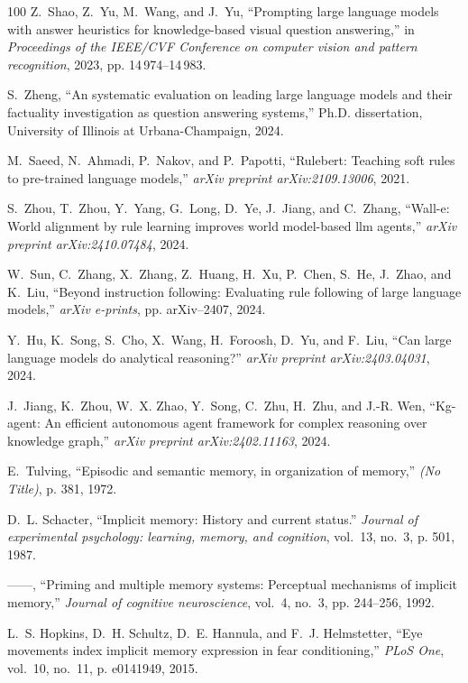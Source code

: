 \documentclass[10pt,journal,compsoc]{IEEEtran}
\begin{document}
\begin{thebibliography}{100}
	Z.~Shao, Z.~Yu, M.~Wang, and J.~Yu, ``Prompting large language models with
	answer heuristics for knowledge-based visual question answering,'' in
	\emph{Proceedings of the IEEE/CVF Conference on computer vision and pattern
		recognition}, 2023, pp. 14\,974--14\,983.
	
	S.~Zheng, ``An systematic evaluation on leading large language models and their
	factuality investigation as question answering systems,'' Ph.D. dissertation,
	University of Illinois at Urbana-Champaign, 2024.
	
	M.~Saeed, N.~Ahmadi, P.~Nakov, and P.~Papotti, ``Rulebert: Teaching soft rules
	to pre-trained language models,'' \emph{arXiv preprint arXiv:2109.13006},
	2021.
	
	S.~Zhou, T.~Zhou, Y.~Yang, G.~Long, D.~Ye, J.~Jiang, and C.~Zhang, ``Wall-e:
	World alignment by rule learning improves world model-based llm agents,''
	\emph{arXiv preprint arXiv:2410.07484}, 2024.
	
	W.~Sun, C.~Zhang, X.~Zhang, Z.~Huang, H.~Xu, P.~Chen, S.~He, J.~Zhao, and
	K.~Liu, ``Beyond instruction following: Evaluating rule following of large
	language models,'' \emph{arXiv e-prints}, pp. arXiv--2407, 2024.
	
	Y.~Hu, K.~Song, S.~Cho, X.~Wang, H.~Foroosh, D.~Yu, and F.~Liu, ``Can large
	language models do analytical reasoning?'' \emph{arXiv preprint
		arXiv:2403.04031}, 2024.
	
	J.~Jiang, K.~Zhou, W.~X. Zhao, Y.~Song, C.~Zhu, H.~Zhu, and J.-R. Wen,
	``Kg-agent: An efficient autonomous agent framework for complex reasoning
	over knowledge graph,'' \emph{arXiv preprint arXiv:2402.11163}, 2024.
	
	E.~Tulving, ``Episodic and semantic memory, in organization of memory,''
	\emph{(No Title)}, p. 381, 1972.
	
	D.~L. Schacter, ``Implicit memory: History and current status.'' \emph{Journal
		of experimental psychology: learning, memory, and cognition}, vol.~13, no.~3,
	p. 501, 1987.
	
	------, ``Priming and multiple memory systems: Perceptual mechanisms of
	implicit memory,'' \emph{Journal of cognitive neuroscience}, vol.~4, no.~3,
	pp. 244--256, 1992.
	
	L.~S. Hopkins, D.~H. Schultz, D.~E. Hannula, and F.~J. Helmstetter, ``Eye
	movements index implicit memory expression in fear conditioning,'' \emph{PLoS
		One}, vol.~10, no.~11, p. e0141949, 2015.
	

\end{thebibliography}
\end{document}

